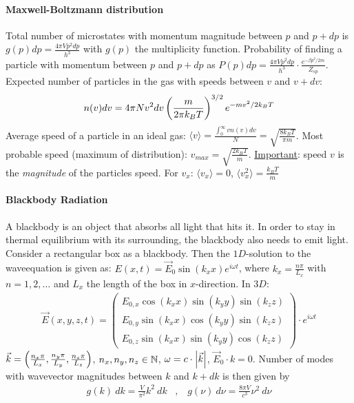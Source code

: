 \paragraph{Maxwell-Boltzmann distribution}
Total number of microstates with momentum magnitude between $p$ and $p + dp$ is
$g(p) dp = \frac{4 \pi V p^2 dp}{h^3}$ with $g(p)$ the multiplicity function.
Probability of finding a particle with momentum between $p$ and $p+dp$ as
$P(p) dp = \frac{4 \pi V p^2 dp}{h^3} \cdot \frac{e^{-\beta p^2 /2m}}{Z_{sp}}$.
Expected number of particles in the gas with speeds between $v$ and $v+dv$:
\begin{align*}
    n(v) dv = 4 \pi N v^2 dv \left( \frac{m}{2 \pi k_B T} \right)^{3/2} e^{-m v^2 / 2 k_B T}
\end{align*}
Average speed of a particle in an ideal gas: $\langle v \rangle =
\frac{\int_0^\infty v n(v) dv}{N} = \sqrt{\frac{8 k_B T}{\pi m}}$.
Most probable speed (maximum of distribution): $v_{max} = \sqrt{\frac{2 k_B T}{m}}$.
\underline{Important}: speed $v$ is the \textit{magnitude} of the particles speed.
For $v_x$: $\langle v_x \rangle = 0$, $\langle v_x^2 \rangle = \frac{k_B T}{m}$

\paragraph{Blackbody Radiation}
A blackbody is an object that absorbs all light that hits it. In order to stay
in thermal equilibrium with its surrounding, the blackbody also needs to emit
light. Consider a rectangular box as a blackbody. Then the $1D$-solution to the
waveequation is given as: $E(x,t) = \vec{E}_0 \sin(k_x x) e^{i \omega t}$,
where $k_x = \frac{n \pi}{L_x}$ with $n=1,2,\dots$ and $L_x$ the length of the
box in $x$-direction. In $3D$:
\begin{align*}
    \vec{E}(x,y,z,t) = \begin{pmatrix}
        E_{0,x} \cos(k_x x) \sin(k_y y) \sin(k_z z) \\
        E_{0,y} \sin(k_x x) \cos(k_y y) \sin(k_z z) \\
        E_{0,z} \sin(k_x x) \sin(k_y y) \cos(k_z z)
    \end{pmatrix} \cdot e^{i \omega t}
\end{align*}
$\vec{k} = \left( \frac{n_x \pi}{L_x} , \frac{n_y \pi}{L_y} , \frac{n_z \pi}{L_z} \right)$,
$n_x,n_y,n_z \in \mathbb{N}$, $\omega = c \cdot \left\vert \vec{k} \right\vert$, $\vec{E}_{0} \cdot k = 0$.
Number of modes with wavevector magnitudes between $k$ and $k+dk$ is then given by
\begin{align*}
    g(k) \ dk = \frac{V}{\pi^2} k^2 \ dk
    \hspace{10pt} , \hspace{10pt}
    g(\nu) \ d \nu = \frac{8 \pi V}{c^3} \nu^2 \ d \nu
\end{align*}

